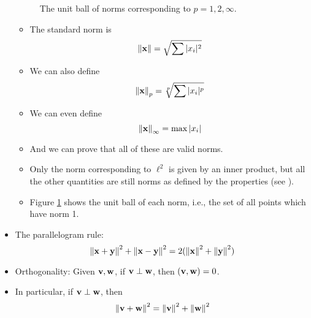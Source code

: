 \documentclass[../../notes.tex]{subfiles}
\begin{document}
\begin{itemize}
\begin{figure}[h!]
        \caption{The unit ball of norms corresponding to $p=1,2,\infty$.}
        \label{fig:normUnitBall}
    \end{figure}
    \begin{itemize}
        \item The standard norm is
        \begin{equation*}
            \norm{\mathbf{x}} = \sqrt{\sum|x_i|^2}
        \end{equation*}
        \item We can also define
        \begin{equation*}
            \norm{\mathbf{x}}_p = \sqrt[p]{\sum|x_i|^p}
        \end{equation*}
        \item We can even define
        \begin{equation*}
            \norm{\mathbf{x}}_\infty = \max|x_i|
        \end{equation*}
        \item And we can prove that all of these are valid norms.
        \item Only the norm corresponding to $\ell^2$ is given by an inner product, but all the other quantities are still norms as defined by the properties (see \textcite{bib:Treil}).
        \item Figure \ref{fig:normUnitBall} shows the unit ball of each norm, i.e., the set of all points which have norm 1.
    \end{itemize}
    \item The parallelogram rule:
    \begin{equation*}
        \norm{\mathbf{x}+\mathbf{y}}^2+\norm{\mathbf{x}-\mathbf{y}}^2 = 2(\norm{\mathbf{x}}^2+\norm{\mathbf{y}}^2)
    \end{equation*}
    \item Orthogonality: Given $\mathbf{v},\mathbf{w}$, if $\mathbf{v}\perp\mathbf{w}$, then $(\mathbf{v},\mathbf{w})=0$.
    \item In particular, if $\mathbf{v}\perp\mathbf{w}$, then
    \begin{equation*}
        \norm{\mathbf{v}+\mathbf{w}}^2 = \norm{\mathbf{v}}^2+\norm{\mathbf{w}}^2
    \end{equation*}

\end{itemize}
\end{document}
